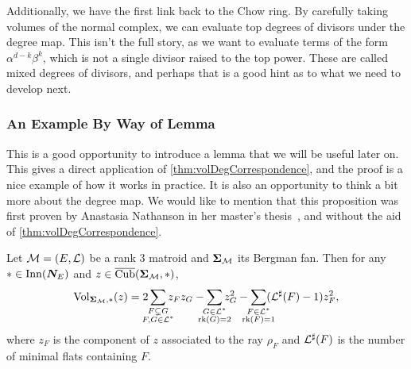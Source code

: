 \documentclass[12pt,oneside]{../../sfsuthesis}
\begin{document}
Additionally, we have the first link back to the Chow ring.
By carefully taking volumes of the normal complex, we can evaluate top degrees of divisors under the degree map.
This isn't the full story, as we want to evaluate terms of the form \( \alpha^{d-k}\beta^k \), which is not a single divisor raised to the top power.
These are called mixed degrees of divisors, and perhaps that is a good hint as to what we need to develop next.

\subsubsection{An Example By Way of Lemma}

This is a good opportunity to introduce a lemma that we will be useful later on.
This gives a direct application of \th\ref{thm:volDegCorrespondence}, and the proof is a nice example of how it works in practice.
It is also an opportunity to think a bit more about the degree map.
We would like to mention that this proposition was first proven by Anastasia Nathanson in her master's thesis~\cite{nathansonGeometricVolumeRank2021}, and without the aid of \th\ref{thm:volDegCorrespondence}.
\begin{lemma}\th\label{thm:volRank3}
    Let \( \mathcal{M}=(E,\mathcal{L}) \) be a rank 3 matroid and \( {\bm{\Sigma}}_{\mathcal{M}}  \) its Bergman fan.
    Then for any \( \ast \in \mathrm{Inn}(\bm{N}_E) \) and \( z \in \operatorname{\overline{Cub}}({\bm{\Sigma}}_{\mathcal{M}}, \ast) \),
    \[
        \Vol_{\bSigma_\cM, \ast}(z) =  2\sum_{\mathclap{\substack{F \subsetneq G \\ F,G \in \cL^\ast}}} z_F z_G - \sum_{\mathclap{\substack{G \in \cL^\ast \\ \rk(G)=2}}} z_G^2 - \sum_{\mathclap{\substack{F \in \cL^\ast \\ \rk(F)=1}}}(\cL^\sharp(F) - 1)z_F^2,
    \]
    where \( z_F \) is the component of \( z \) associated to the ray \( \rho_F \) and \( \mathcal{L}^\sharp(F) \) is the number of minimal flats containing \( F \).
\end{lemma}
\end{document}
